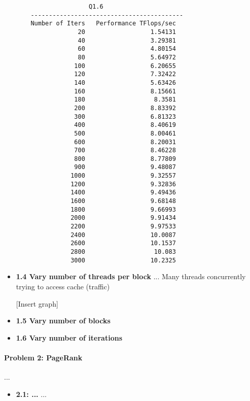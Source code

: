\documentclass[12pt,letterpaper,twoside]{article}
\begin{document}
\begin{itemize}
\begin{verbatim}
                    Q1.6
    ------------------------------------------ 
    Number of Iters   Performance TFlops/sec
                 20                  1.54131
                 40                  3.29381
                 60                  4.80154
                 80                  5.64972
                100                  6.20655
                120                  7.32422
                140                  5.63426
                160                  8.15661
                180                   8.3581
                200                  8.83392
                300                  6.81323
                400                  8.40619
                500                  8.00461
                600                  8.20031
                700                  8.46228
                800                  8.77809
                900                  9.48087
               1000                  9.32557
               1200                  9.32836
               1400                  9.49436
               1600                  9.68148
               1800                  9.66993
               2000                  9.91434
               2200                  9.97533
               2400                  10.0087
               2600                  10.1537
               2800                   10.083
               3000                  10.2325
    \end{verbatim}

    \item \textbf{1.4 Vary number of threads per block} ... 
    Many threads concurrently trying to access cache (traffic)

    [Insert graph]

    \item \textbf{1.5 Vary number of blocks}

    \item \textbf{1.6 Vary number of iterations}
    
\end{itemize}


\paragraph{Problem 2: PageRank} ...

\begin{itemize}
    \item \textbf{2.1: ...} ...


\end{itemize}
\end{document}
